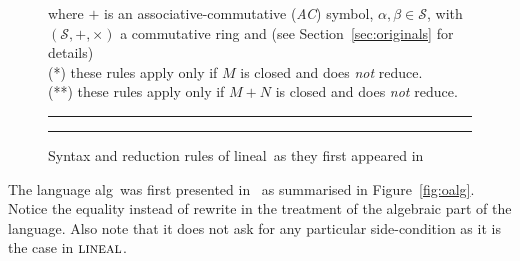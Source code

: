 \documentclass{LMCS}
\newcommand{\olin}{\mbox{\sc lineal}}
\newcommand{\oalg}{\mbox{\sc alg}}
\begin{document}
\begin{figure}
  \noindent where $+$ is an associative-commutative ({\em AC}) symbol,
  $\alpha, \beta\in\mathcal{S}$, with $(\mathcal{S},+,\times)$ a
  commutative ring and (see Section~\ref{sec:originals} for details)\\
  (*) these rules apply only if $M$ is closed and does {\em not} reduce.\\
  (**) these rules apply only if $M+N$ is closed and does {\em not} reduce.
  \medskip

  \hrule\vspace{1pt}\hrule
  \caption{Syntax and reduction rules of \olin\ as they first appeared in~\cite{ArrighiDowekRTA08}}
  \label{fig:olin}
\end{figure}

The language \oalg\ was first presented in~\cite{VauxMSCS09} as
summarised in Figure~\ref{fig:oalg}. Notice the equality instead of
rewrite in the treatment of the algebraic part of the language. Also
note that it does not ask for any particular side-condition as it is
the case in $\olin$.
\end{document}
